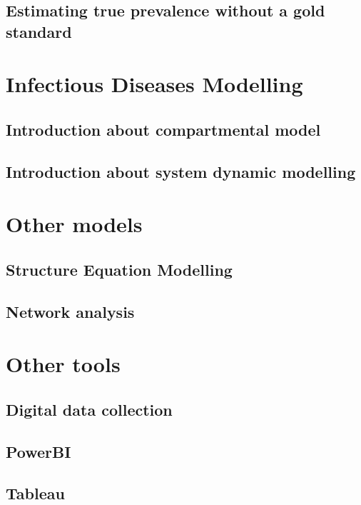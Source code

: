 \documentclass[
]{article}
\begin{document}
\hypertarget{estimating-true-prevalence-without-a-gold-standard}{%
\subsection{Estimating true prevalence without a gold standard}\label{estimating-true-prevalence-without-a-gold-standard}}

\hypertarget{infectious-diseases-modelling}{%
\section{Infectious Diseases Modelling}\label{infectious-diseases-modelling}}

\hypertarget{introduction-about-compartmental-model}{%
\subsection{Introduction about compartmental model}\label{introduction-about-compartmental-model}}

\hypertarget{introduction-about-system-dynamic-modelling}{%
\subsection{Introduction about system dynamic modelling}\label{introduction-about-system-dynamic-modelling}}

\hypertarget{other-models}{%
\section{Other models}\label{other-models}}

\hypertarget{structure-equation-modelling}{%
\subsection{Structure Equation Modelling}\label{structure-equation-modelling}}

\hypertarget{network-analysis}{%
\subsection{Network analysis}\label{network-analysis}}

\hypertarget{other-tools}{%
\section{Other tools}\label{other-tools}}

\hypertarget{digital-data-collection}{%
\subsection{Digital data collection}\label{digital-data-collection}}

\hypertarget{powerbi}{%
\subsection{PowerBI}\label{powerbi}}

\hypertarget{tableau}{%
\subsection{Tableau}\label{tableau}}
\end{document}
